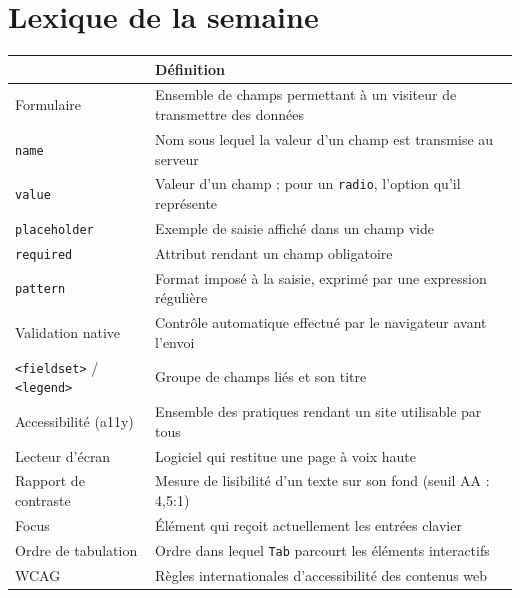 \documentclass[a4paper,11pt]{article}
\newcommand{\hdr}[1]{\multicolumn{1}{l}{\color{white}\bfseries #1}}
\renewcommand{\arraystretch}{1.3}
\begin{document}
\section{Lexique de la semaine}

\begin{center}
\renewcommand{\arraystretch}{1.0}
\begin{tabularx}{\linewidth}{p{4cm}X}
  \toprule
  \rowcolor{uniNavy}
  \hdr{Terme} & \hdr{Définition} \\
  \midrule
  \rowcolor{uniPaper}
  Formulaire & Ensemble de champs permettant à un visiteur de transmettre des données \\
  \texttt{name} & Nom sous lequel la valeur d'un champ est transmise au serveur \\
  \rowcolor{uniPaper}
  \texttt{value} & Valeur d'un champ ; pour un \texttt{radio}, l'option qu'il représente \\
  \texttt{placeholder} & Exemple de saisie affiché dans un champ vide \\
  \rowcolor{uniPaper}
  \texttt{required} & Attribut rendant un champ obligatoire \\
  \texttt{pattern} & Format imposé à la saisie, exprimé par une expression régulière \\
  \rowcolor{uniPaper}
  Validation native & Contrôle automatique effectué par le navigateur avant l'envoi \\
  \texttt{<fieldset>} / \texttt{<legend>} & Groupe de champs liés et son titre \\
  \rowcolor{uniPaper}
  Accessibilité (a11y) & Ensemble des pratiques rendant un site utilisable par tous \\
  Lecteur d'écran & Logiciel qui restitue une page à voix haute \\
  \rowcolor{uniPaper}
  Rapport de contraste & Mesure de lisibilité d'un texte sur son fond (seuil AA : 4{,}5:1) \\
  Focus & Élément qui reçoit actuellement les entrées clavier \\
  \rowcolor{uniPaper}
  Ordre de tabulation & Ordre dans lequel \texttt{Tab} parcourt les éléments interactifs \\
  WCAG & Règles internationales d'accessibilité des contenus web \\
  \bottomrule
\end{tabularx}
\end{center}
\end{document}

